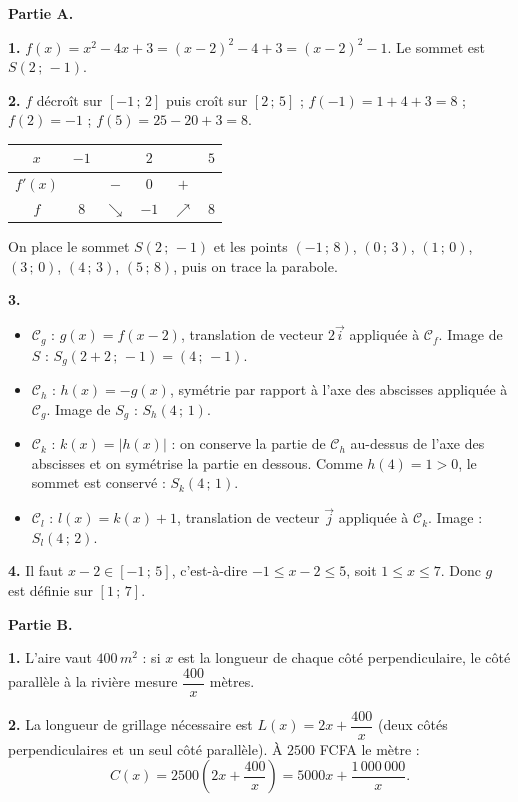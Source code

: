 \documentclass[11pt]{article}
\begin{document}
\begin{corrige}
\textbf{Partie A.}

\textbf{1.} $f(x)=x^{2}-4x+3=(x-2)^{2}-4+3=(x-2)^{2}-1$. Le sommet est $S(2\,;\,-1)$.

\textbf{2.} $f$ décroît sur $[-1\,;\,2]$ puis croît sur $[2\,;\,5]$ ; $f(-1)=1+4+3=8$ ; $f(2)=-1$ ; $f(5)=25-20+3=8$.
\begin{center}
\begin{tabular}{|c|ccccc|}\hline $x$ & $-1$ & & $2$ & & $5$ \\ \hline $f'(x)$ & & $-$ & $0$ & $+$ & \\ \hline $f$ & $8$ & $\searrow$ & $-1$ & $\nearrow$ & $8$ \\ \hline\end{tabular}
\end{center}
On place le sommet $S(2\,;\,-1)$ et les points $(-1\,;\,8)$, $(0\,;\,3)$, $(1\,;\,0)$, $(3\,;\,0)$, $(4\,;\,3)$, $(5\,;\,8)$, puis on trace la parabole.

\textbf{3.} \begin{itemize}
\item $\mathcal{C}_{g}$ : $g(x)=f(x-2)$, translation de vecteur $2\vec{i}$ appliquée à $\mathcal{C}_{f}$. Image de $S$ : $S_{g}(2+2\,;\,-1)=(4\,;\,-1)$.
\item $\mathcal{C}_{h}$ : $h(x)=-g(x)$, symétrie par rapport à l'axe des abscisses appliquée à $\mathcal{C}_{g}$. Image de $S_{g}$ : $S_{h}(4\,;\,1)$.
\item $\mathcal{C}_{k}$ : $k(x)=|h(x)|$ : on conserve la partie de $\mathcal{C}_{h}$ au-dessus de l'axe des abscisses et on symétrise la partie en dessous. Comme $h(4)=1>0$, le sommet est conservé : $S_{k}(4\,;\,1)$.
\item $\mathcal{C}_{l}$ : $l(x)=k(x)+1$, translation de vecteur $\vec{j}$ appliquée à $\mathcal{C}_{k}$. Image : $S_{l}(4\,;\,2)$.
\end{itemize}

\textbf{4.} Il faut $x-2\in[-1\,;\,5]$, c'est-à-dire $-1\leq x-2\leq 5$, soit $1\leq x\leq 7$. Donc $g$ est définie sur $[1\,;\,7]$.

\textbf{Partie B.}

\textbf{1.} L'aire vaut $400\,m^{2}$ : si $x$ est la longueur de chaque côté perpendiculaire, le côté parallèle à la rivière mesure $\dfrac{400}{x}$ mètres.

\textbf{2.} La longueur de grillage nécessaire est $L(x)=2x+\dfrac{400}{x}$ (deux côtés perpendiculaires et un seul côté parallèle). À $2500$ FCFA le mètre :
\[ C(x)=2500\left(2x+\frac{400}{x}\right)=5000x+\frac{1\,000\,000}{x}. \]


\end{corrige}
\end{document}

